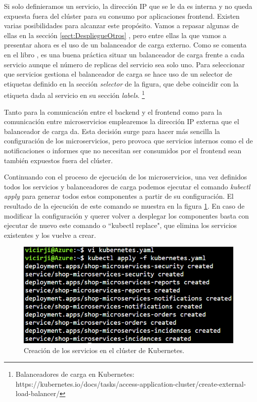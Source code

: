 \documentclass[11pt,spanish,listoffigures]{tfgetsinf}
\begin{document}
Si solo definieramos un servicio, la dirección IP que se le da es interna y no queda expuesta fuera del clúster para su consumo por aplicaciones frontend. Existen varias posibilidades para alcanzar este propósito. Vamos a repasar algunas de ellas en la sección \ref{sect:DespliegueOtros} , pero entre ellas la que vamos a presentar ahora es el uso de un balanceador de carga externo. Como se comenta en el libro \cite{Rensin2015}, es una buena práctica situar un balanceador de carga frente a cada servicio aunque el número de replicas del servicio sea solo uno. Para seleccionar que servicios gestiona el balanceador de carga se hace uso de un selector de etiquetas definido en la sección \textit{selector} de la figura, que debe coincidir con la etiqueta dada al servicio en su sección \textit{labels}. \footnote{ Balanceadores de carga en Kubernetes: https://kubernetes.io/docs/tasks/access-application-cluster/create-external-load-balancer/}

Tanto para la comunicación entre el backend y el frontend como para la comunicación entre microservicios emplearemos la dirección IP externa que el balanceador de carga da. Esta decisión surge para hacer más sencilla la configuración de los microservicios, pero provoca que servicios internos como el de notificaciones o informes que no necesitan ser consumidos por el frontend sean también expuestos fuera del clúster.

Continuando con el proceso de ejecución de los microservicios, una vez definidos todos los servicios y balanceadores de carga podemos ejecutar el comando \textit{kubectl apply} para generar todos estos componentes a partir de su configuración. El resultado de la ejecución de este comando se muestra en la figura \ref{fig:KubernetesApply}. En caso de modificar la configuración y querer volver a desplegar los componentes basta con ejecutar de nuevo este comando o ``kubectl replace", que elimina los servicios existentes y los vuelve a crear.

\begin{figure}[h]
\centering
\includegraphics[scale=0.8]{KubernetesApply}
\caption{Creación de los servicios en el clúster de Kubernetes.}
\label{fig:KubernetesApply}
\end{figure}
\end{document}
